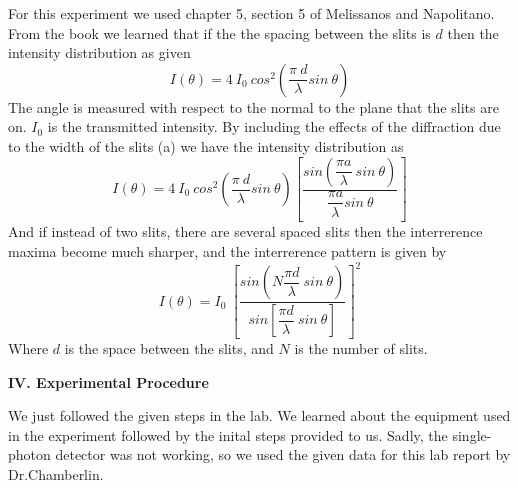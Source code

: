 \documentclass[fleqn]{article}
\begin{document}
  For this experiment we used chapter 5, section 5 of Melissanos and Napolitano. \textcite{Four} From the book we 
  learned that if the the spacing between the slits is $d$ then the intensity distribution as given
  $$
    I(\theta)=4 ~ I_0 ~ cos^2 \left(\dfrac{\pi ~ d}{\lambda} sin~ \theta\right)
  $$
  The angle is measured with respect to the normal to the plane that the slits are on. $I_0$ is the transmitted intensity.
  By including the effects of the diffraction due to the width of the slits (a) we have the intensity distribution as
  $$
    I(\theta)=4 ~ I_0 ~ cos^2 \left(\dfrac{\pi ~ d}{\lambda} sin~ \theta\right)
    \left[
      \dfrac{
        sin \left(\dfrac{\pi a}{\lambda} ~ sin ~ \theta\right)
      }{
        \dfrac{\pi a}{\lambda} sin ~ \theta
      }
    \right]
  $$
  And if instead of two slits, there are several spaced slits then the interrerence maxima become much sharper, and the
  interrerence pattern is given by
  $$
    I(\theta)=I_0 ~ \left[
      \dfrac{
        sin \left(N \dfrac{\pi d}{\lambda} ~ sin ~ \theta \right)
      }{
        sin \left[\dfrac{\pi d}{\lambda} ~ sin ~ \theta\right]
      }
    \right]^2
  $$
  Where $d$ is the space between the slits, and $N$ is the number of slits.  

  \pagebreak


  \textbf{IV. Experimental Procedure}

  \vspace{10px}

  We just followed the given steps in the lab. We learned about the equipment used in the experiment followed
  by the inital steps provided to us. Sadly, the single-photon detector was not working, so 
  we used the given data for this lab report by Dr.Chamberlin. \textcite{Five} 
  
\end{document}
